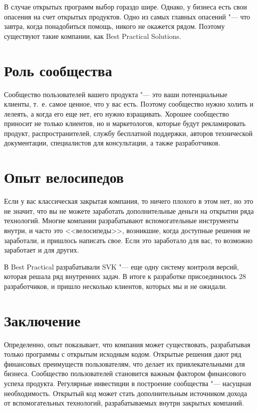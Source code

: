 \documentclass[10pt, a5paper]{article}
\begin{document}
В случае открытых программ выбор гораздо шире. Однако, у бизнеса есть свои опасения на счет
открытых продуктов. Одно из самых главных опасений "--- что завтра, когда понадобиться
помощь, никого не окажется рядом. Поэтому существуют такие компании, как Best Practical
Solutions.

\section*{Роль сообщества}

Сообщество пользователей вашего продукта "--- это ваши потенциальные клиенты,
т.~е. самое ценное, что у вас есть. Поэтому
сообщество нужно холить и лелеять, а когда его еще нет, его нужно
взращивать. Хорошее сообщество приносит не только клиентов, но и
маркетологов, которые будут рекламировать продукт, распространителей,
службу бесплатной поддержки, авторов технической документации,
специалистов для консультации, а также разработчиков.

\section*{Опыт велосипедов}

Если у вас классическая закрытая компания, то ничего плохого в этом нет, но
это не значит, что вы не можете заработать дополнительные деньги на открытии
ряда технологий. 
Многие компании разрабатывают вспомогательные инструменты внутри, и часто
это <<велосипеды>>, возникшие, когда доступные решения не заработали, и пришлось написать
свое. Если это заработало для вас, то возможно заработает и для других.

В Best Practical разрабатывали SVK "--- еще одну систему контроля версий,
которая решала ряд внутренних задач. В итоге к разработке присоединилось
28 разработчиков, и пришло несколько клиентов, которых мы и не ожидали.

\section*{Заключение}

Определенно, опыт показывает, что компания может существовать, разрабатывая
только программы с открытым исходным кодом. Открытые решения дают ряд
финансовых преимуществ пользователям, что делает их привлекательными для
бизнеса. Сообщество пользователей становится важным фактором финансового
успеха продукта. Регулярные инвестиции в построение сообщества "--- насущная
необходимость. Открытый код может стать дополнительным источником дохода
от вспомогательных технологий, разрабатываемых внутри закрытых компаний.
\end{document}
